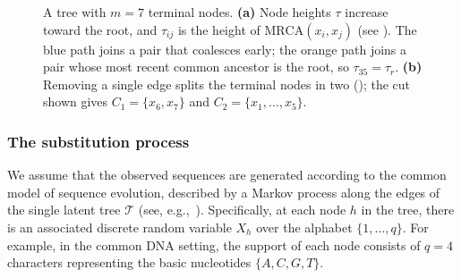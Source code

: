 \begin{figure}[t]
\begin{subfigure}[t]{0.49\textwidth}
\label{fig:topology-clades}
\end{subfigure}

\caption{A tree with $m=7$ terminal nodes. \textbf{(a)} Node heights $\tau$ increase toward the root, and $\tau_{ij}$ is the height of $\mathrm{MRCA}(x_i,x_j)$ (see ). The blue path joins a pair that coalesces early; the orange path joins a pair whose most recent common ancestor is the root, so $\tau_{35}=\tau_r$. \textbf{(b)} Removing a single edge splits the terminal nodes in two (); the cut shown gives $C_1=\{x_6,x_7\}$ and $C_2=\{x_1,\dots,x_5\}$.}
\label{fig:tree_topology}
\end{figure}

\subsubsection*{The substitution process}

We assume that the observed sequences are generated according to the common model of sequence evolution, described by a Markov process along the edges of the single latent tree $\mathcal{T}$ (see, e.g.,~\cite[Chapter 1]{yang2014molecular}). 
Specifically, at each node $h$ in the tree, there is an associated discrete random variable $X_h$ over the alphabet $\{1, \ldots, q\}$. For example, in the common DNA setting, the support of each node consists of $q=4$ characters representing the basic nucleotides $\{A,C,G,T\}$.

